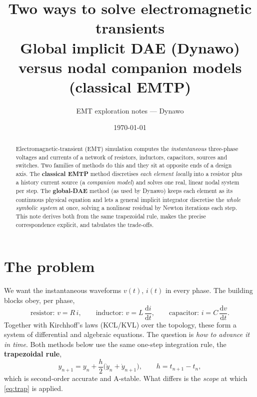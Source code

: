 \documentclass[11pt]{article}
\title{\bfseries Two ways to solve electromagnetic transients\\[2pt]
\large Global implicit DAE (Dynawo) versus nodal companion models (classical EMTP)}
\author{EMT exploration notes --- Dynawo}
\date{\today}
\newcommand{\dd}{\mathrm{d}}
\newcommand{\hstep}{h}
\begin{document}
\maketitle

\begin{abstract}
Electromagnetic-transient (EMT) simulation computes the \emph{instantaneous}
three-phase voltages and currents of a network of resistors, inductors,
capacitors, sources and switches. Two families of methods do this and they sit
at opposite ends of a design axis. The \textbf{classical EMTP} method
discretises \emph{each element locally} into a resistor plus a history current
source (a \emph{companion model}) and solves one real, linear nodal system per
step. The \textbf{global-DAE} method (as used by Dynawo) keeps each element as
its continuous physical equation and lets a general implicit integrator
discretise the \emph{whole symbolic system} at once, solving a nonlinear
residual by Newton iterations each step. This note derives both from the same
trapezoidal rule, makes the precise correspondence explicit, and tabulates the
trade-offs.
\end{abstract}

\tableofcontents

\section{The problem}

We want the instantaneous waveforms $v(t)$, $i(t)$ in every phase. The building
blocks obey, per phase,
\begin{equation}
\text{resistor: } v = R\,i,
\qquad
\text{inductor: } v = L\,\frac{\dd i}{\dd t},
\qquad
\text{capacitor: } i = C\,\frac{\dd v}{\dd t}.
\label{eq:constitutive}
\end{equation}
Together with Kirchhoff's laws (KCL/KVL) over the topology, these form a system
of differential and algebraic equations. The question is \emph{how to advance it
in time}. Both methods below use the same one-step integration rule, the
\textbf{trapezoidal rule},
\begin{equation}
y_{n+1} = y_n + \frac{\hstep}{2}\big(\dot y_n + \dot y_{n+1}\big),
\qquad \hstep = t_{n+1}-t_n,
\label{eq:trap}
\end{equation}
which is second-order accurate and A-stable. What differs is the
\emph{scope} at which \eqref{eq:trap} is applied.
\end{document}
